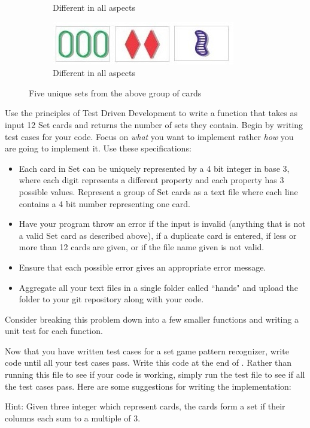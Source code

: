 \begin{problem}
\begin{figure}[H]
\begin{subfigure}{.47\textwidth}
    \caption{Different in all aspects}
    \label{fig:labeltheotherfigure}
\end{subfigure}
\begin{subfigure}{.47\textwidth}
    \centering
    \includegraphics[width=\linewidth]{figures/set5.jpg}
    \caption{Different in all aspects}
    \label{fig:labeltheotherfigure}
\end{subfigure}
\caption{Five unique sets from the above group of cards}
\end{figure}

\vspace{5mm}

Use the principles of Test Driven Development to write a function that takes as input 12 Set cards and returns the number of sets they contain. Begin by writing test cases for your code. Focus on \emph{what} you want to implement rather \emph{how} you are going to implement it. Use these specifications:
\begin{itemize}
\item Each card in Set can be uniquely represented by a 4 bit integer in base 3, where each digit represents a different property and each property has 3 possible values. Represent a group of Set cards as a text file where each line contains a 4 bit number representing one card.
\item Have your program throw an error if the input is invalid (anything that is not a valid Set card as described above),  if a duplicate card is entered, if less or more than 12 cards are given, or if the file name given is not valid.
\item Ensure that each possible error gives an appropriate error message.
\item Aggregate all your text files in a single folder called ``hands" and upload the folder to your git repository along with your code.
\end{itemize}

Consider breaking this problem down into a few smaller functions and writing a unit test for each function.

\end{problem}

\begin{problem}
Now that you have written test cases for a set game pattern recognizer, write code until all your test cases pass. Write this code at the end of . Rather than running this file to see if your code is working, simply run the test file to see if all the test cases pass. Here are some suggestions for writing the implementation:

Hint: Given three integer which represent cards, the cards form a set if their columns each sum to a multiple of 3.

\end{problem}

